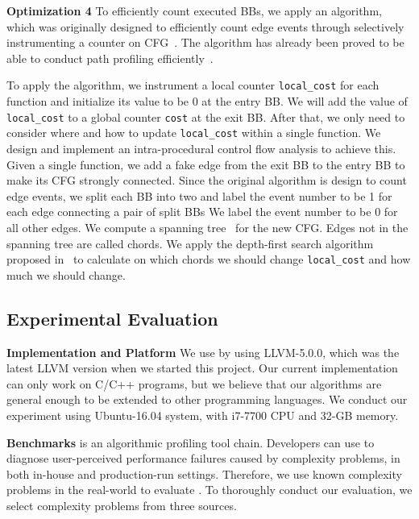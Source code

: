 \noindent\textbf{Optimization 4}
To efficiently count executed BBs, 
we apply an algorithm, which was originally designed to 
efficiently count edge events through selectively instrumenting a counter 
on CFG~\cite{event-counting}.
The algorithm has already been proved to be able to 
conduct path profiling efficiently~\cite{peter-ase,path-profiling}. 

To apply the algorithm,
we instrument a local counter \texttt{local\_cost} for each function
and initialize its value to be 0 at the entry BB. 
We will add the value of \texttt{local\_cost} to a global counter \texttt{cost} 
at the exit BB.
After that, we only need to consider where 
and how to update \texttt{local\_cost} 
within a single function.
We design and implement an intra-procedural control flow analysis
to achieve this.
Given a single function,
we add a fake edge from the exit BB to the entry BB 
to make its CFG strongly connected. 
Since the original algorithm is design to count edge events,
we split each BB into two 
and label the event number to be 1 for each edge connecting a pair of split BBs 
We label the event number to be 0 for all other edges.
We compute a spanning tree~\cite{spanning} for the new CFG.
Edges not in the spanning tree are called chords.
We apply the depth-first search algorithm proposed in~\cite{event-counting} 
to calculate on which chords we should change 
\texttt{local\_cost} 
and how much we should change.

\subsection{Experimental Evaluation}

\noindent\textbf{Implementation and Platform}
We use \Tool by using LLVM-5.0.0, which was the latest LLVM version when we started this project.
Our current implementation can only work on C/C++ programs, 
but we believe that our algorithms are general enough to be extended 
to other programming languages.
We conduct our experiment using Ubuntu-16.04 system, 
with i7-7700 CPU and 32-GB memory. 


\noindent\textbf{Benchmarks}
\Tool is an algorithmic profiling tool chain.
Developers can use \Tool to diagnose user-perceived performance failures caused by complexity problems, 
in both in-house and production-run settings. 
Therefore, we use known complexity problems in the real-world to evaluate \Tool. 
To thoroughly conduct our evaluation, 
we select complexity problems from three sources. 



